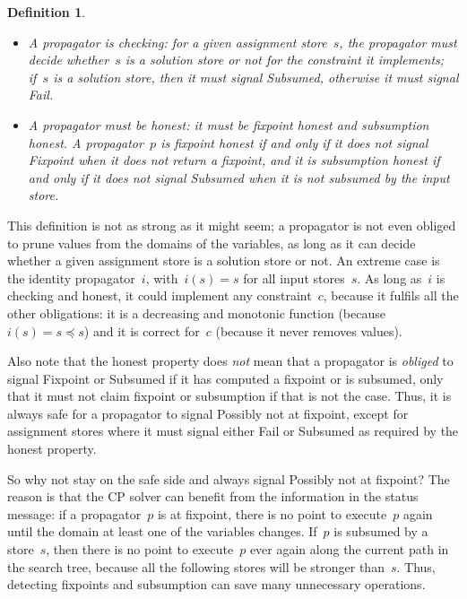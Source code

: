\documentclass[a4paper,11pt]{article}
\newtheorem{definition}{Definition}
\numberwithin{equation}{section}
\begin{document}
\begin{definition}
\begin{itemize}
  \item A propagator is \emph{checking}: for a given assignment store~$s$, the propagator
    must decide whether~$s$ is a solution store or not for the constraint it
    implements; if~$s$ is a solution store, then it must signal \emph{Subsumed},
    otherwise it must signal \emph{Fail}.

  \item A propagator must be \emph{honest}: it must be 
    fixpoint honest and subsumption honest. 
    A propagator~$p$ is \emph{fixpoint honest} if and only if it does not signal 
    \emph{Fixpoint} when it does not return a fixpoint, and it is
    \emph{subsumption honest} if and only if it does
    not signal \emph{Subsumed} when it is not subsumed by the input store.
    
\end{itemize}

\end{definition}
This definition is not as strong as it might seem; a propagator is not even
obliged to prune values from the domains of the variables,
as long as it can decide whether a given
assignment store is a solution store or not.
An extreme case is the identity propagator~$i$, with~$i(s) = s$ for all input stores~$s$.
As long as~$i$ is checking and honest, it could implement any constraint~$c$,
because it fulfils all the other obligations: it is a decreasing and monotonic function
(because~$i(s) = s \preceq s$) and it is correct for~$c$
(because it never removes values).

Also note that the honest property does \emph{not} mean that a
propagator is \emph{obliged} to signal Fixpoint or Subsumed
if it has computed a fixpoint or is subsumed, only that it must not 
claim fixpoint or subsumption if that is not the case.
Thus, it is always safe 
for a propagator to signal Possibly not at fixpoint, except for
assignment stores where it must signal either Fail or Subsumed
as required by the honest property. 

So why not stay on the safe side and always signal Possibly not at fixpoint?
The reason is that the CP solver can benefit from the information
in the status message: if a propagator~$p$ is at fixpoint, there is no point to
execute~$p$ again until the domain at least one of the variables changes.
If~$p$ is subsumed by a store~$s$, then there is no point to execute~$p$
ever again along the current path in the search tree, because all the following
stores will be stronger than~$s$. Thus, detecting fixpoints and subsumption
can save many unnecessary operations.
\end{document}
